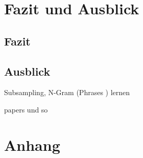 \documentclass[12pt,a4paper]{report}
\begin{document}
\newpage
\chapter{Fazit und Ausblick}
\section{Fazit}

\newpage
\section{Ausblick}
Subsampling, N-Gram (Phrases ) lernen
\newpage


papers und so
\listoftables
\listoffigures 




\chapter{Anhang}
\end{document}
